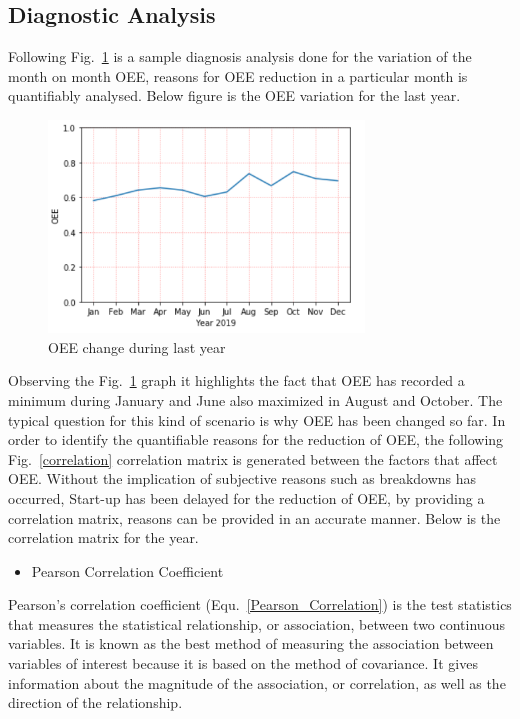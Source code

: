 \subsection {Diagnostic Analysis}

Following Fig.~\ref{OEELastYear} is a sample diagnosis analysis done for the variation of the month on month OEE, reasons for OEE reduction in a particular month is quantifiably analysed. Below figure is the OEE variation for the last year.

\begin{figure}[ht]
  \begin{center}
  \includegraphics[width=3.3in]{photo/oee_last_year.png}
  \caption{OEE change during last year}\label{OEELastYear}
  \end{center}
\end{figure}

Observing the  Fig.~\ref{OEELastYear} graph it highlights the fact that OEE has recorded a minimum during January and June also maximized in August and October. The typical question for this kind of scenario is why OEE has been changed so far. In order to identify the quantifiable reasons for the reduction of OEE, the following  Fig.~\ref{correlation} correlation matrix is generated between the factors that affect OEE. Without the implication of subjective reasons such as breakdowns has occurred, Start-up has been delayed for the reduction of OEE, by providing a correlation matrix, reasons can be provided in an accurate manner. Below is the correlation matrix for the year.\\


\begin{itemize}
  \item Pearson Correlation Coefficient 
\end{itemize}

Pearson’s correlation coefficient (Equ.~\ref{Pearson_Correlation}) is the test statistics that measures the statistical relationship, or association, between two continuous variables.  It is known as the best method of measuring the association between variables of interest because it is based on the method of covariance.  It gives information about the magnitude of the association, or correlation, as well as the direction of the relationship.

